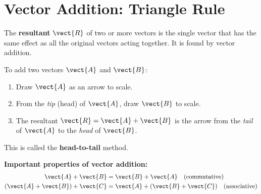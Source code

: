 \section{Vector Addition: Triangle Rule}

\begin{definitionbox}
The \textbf{resultant} $\vect{R}$ of two or more vectors
is the single vector that has the same effect as all the
original vectors acting together. It is found by vector
addition.
\end{definitionbox}

\begin{lawbox}
To add two vectors $\vect{A}$ and $\vect{B}$:
\begin{enumerate}[noitemsep]
  \item Draw $\vect{A}$ as an arrow to scale.
  \item From the \textit{tip} (head) of $\vect{A}$, draw
  $\vect{B}$ to scale.
  \item The resultant $\vect{R} = \vect{A} + \vect{B}$
  is the arrow from the \textit{tail} of $\vect{A}$ to
  the \textit{head} of $\vect{B}$.
\end{enumerate}
This is called the \textbf{head-to-tail} method.
\end{lawbox}

\begin{diagbox}
\begin{center}
\end{center}
\end{diagbox}

\textbf{Important properties of vector addition:}
\begin{align*}
  \vect{A} + \vect{B} &= \vect{B} + \vect{A}
  \quad \text{(commutative)}\\
  (\vect{A}+\vect{B})+\vect{C}
  &= \vect{A}+(\vect{B}+\vect{C})
  \quad \text{(associative)}
\end{align*}

